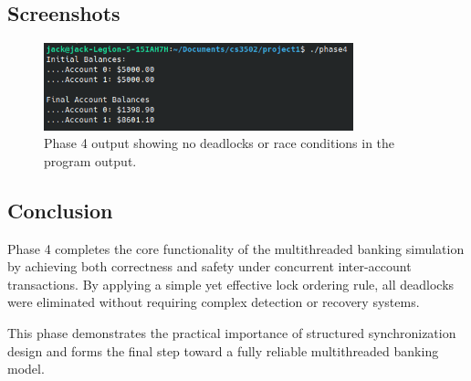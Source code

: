 \documentclass[12pt]{article}
\begin{document}
\subsection{Screenshots}
\begin{figure}[H]
  \centering
  \includegraphics[width=0.8\textwidth]{phase4_completion.png}
  \caption{Phase 4 output showing no deadlocks or race conditions in the program output.}
\end{figure}

\subsection{Conclusion}
Phase 4 completes the core functionality of the multithreaded banking simulation by achieving both correctness and safety under concurrent inter-account transactions.
By applying a simple yet effective lock ordering rule, all deadlocks were eliminated without requiring complex detection or recovery systems.

This phase demonstrates the practical importance of structured synchronization design and forms the final step toward a fully reliable multithreaded banking model.
\end{document}

